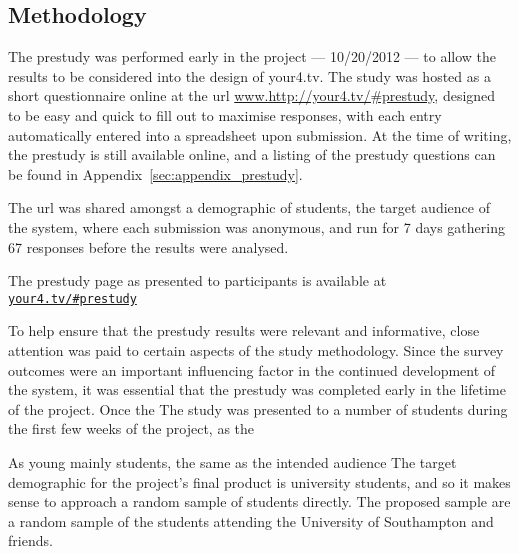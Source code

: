 
\subsection{Methodology}

The prestudy was performed early in the project --- 10/20/2012 --- to allow the results to be considered into the design of your4.tv. The study was hosted as a short questionnaire online at the url \url{www.http://your4.tv/#prestudy}, designed to be easy and quick to fill out to maximise responses, with each entry automatically entered into a spreadsheet upon submission. At the time of writing, the prestudy is still available online, and a listing of the prestudy questions can be found in Appendix~\ref{sec:appendix_prestudy}.

The url was shared amongst a demographic of students, the target audience of the system, where each submission was anonymous, and run for 7 days gathering 67 responses before the results were analysed.

The prestudy page as presented to participants is available at \href{http://your4.tv/\#prestudy}{\texttt{your4.tv/\#prestudy}} 

To help ensure that the prestudy results were relevant and informative, close attention was paid to certain aspects of the study methodology.
Since the survey outcomes were an important influencing factor in the continued development of the system, it was essential that the prestudy was completed early in the lifetime of the project. Once the 
The study was presented to a number of students during the first few weeks of the project, as the 

As young 
mainly students, the same as the intended audience
The target demographic for the project's final product is university students, and so it makes sense to approach a random sample of students directly.
The proposed sample are a random sample of the students attending the University of Southampton and friends.


